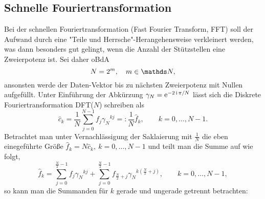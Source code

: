 
\subsection{Schnelle Fouriertransformation}
Bei der schnellen Fouriertransformation (Fast Fourier Transform, FFT) soll der Aufwand durch eine "Teile und Herrsche"-Herangehensweise verkleinert werden, was dann besonders gut gelingt, wenn die Anzahl der Stützstellen eine Zweierpotenz ist.
Sei daher oBdA
\begin{displaymath}
    N = 2^m, \quad m\in\N,
\end{displaymath}
ansonsten werde der Daten-Vektor bis zu nächsten Zweierpotenz mit Nullen aufgefüllt. Unter Einführung der Abkürzung
$\gamma_N = {\operatorname{e}}^{-2\operatorname{i}\pi/N}$ lässt sich die Diskrete Fouriertransformation DFT($N$) schreiben als
\begin{displaymath}
\hat{c}_k = \frac{1}{N} \sum^{N-1}_{j=0} f_j {\gamma_N}^{kj} =: \frac{1}{N} \hat{f}_k, \qquad k=0,\ldots,N-1.
\end{displaymath}
Betrachtet man unter Vernachlässigung der Saklaierung mit $\frac{1}{N}$ die eben einegeführte Größe $\hat{f}_k = N\hat{c}_k, ~ k=0,\ldots,N-1$ und teilt man die Summe auf wie folgt,
\begin{displaymath}
\hat{f}_k =  \sum^{\frac{N}{2}-1}_{j=0} f_j {\gamma_N}^{kj} +  \sum^{\frac{N}{2}-1}_{j=0} f_{\frac{N}{2}+j} {\gamma_N}^{k(\frac{N}{2}+j)}, \qquad k=0,\ldots,N-1,
\end{displaymath}
so kann man die Summanden für $k$ gerade und ungerade getrennt betrachten:
